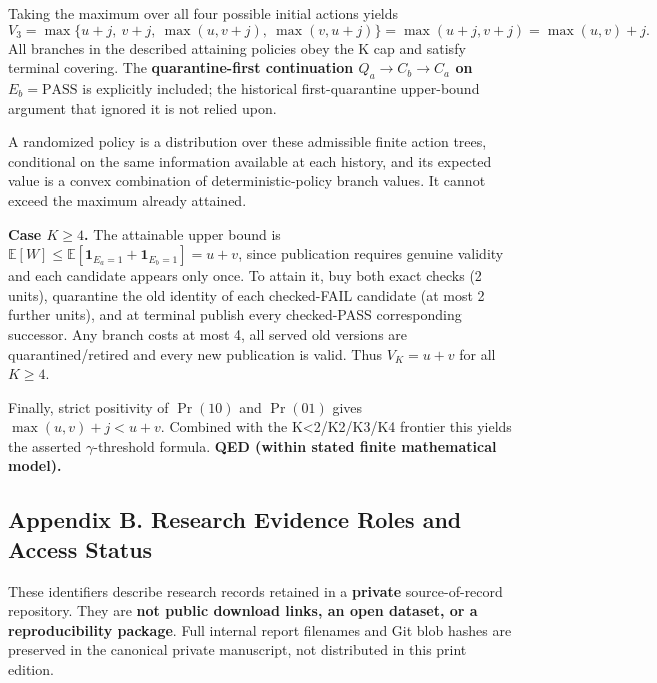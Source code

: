 \documentclass[
  10pt,
  american,
  a4paper,
]{article}
\begin{document}
Taking the maximum over all four possible initial actions yields \[
V_3=\max\{u+j,\ v+j,\ \max(u,v+j),\ \max(v,u+j)\}
=\max(u+j,v+j)=\max(u,v)+j.
\] All branches in the described attaining policies obey the K cap and
satisfy terminal covering. The \textbf{quarantine-first continuation
\(Q_a\to C_b\to C_a\) on \(E_b=\mathrm{PASS}\)} is explicitly included;
the historical first-quarantine upper-bound argument that ignored it is
not relied upon.

A randomized policy is a distribution over these admissible finite
action trees, conditional on the same information available at each
history, and its expected value is a convex combination of
deterministic-policy branch values. It cannot exceed the maximum already
attained.

\textbf{Case \(K\ge4\).} The attainable upper bound is
\(\mathbb E[W]\le\mathbb E[\mathbf 1_{E_a=1}+\mathbf 1_{E_b=1}]=u+v\),
since publication requires genuine validity and each candidate appears
only once. To attain it, buy both exact checks (2 units), quarantine the
old identity of each checked-FAIL candidate (at most 2 further units),
and at terminal publish every checked-PASS corresponding successor. Any
branch costs at most 4, all served old versions are quarantined/retired
and every new publication is valid. Thus \(V_K=u+v\) for all \(K\ge4\).

Finally, strict positivity of \(\Pr(10)\) and \(\Pr(01)\) gives
\(\max(u,v)+j<u+v\). Combined with the K\textless2/K2/K3/K4 frontier
this yields the asserted \(\gamma\)-threshold formula. \textbf{QED
(within stated finite mathematical model).}

\hypertarget{appendix-b.-research-evidence-roles-and-access-status}{%
\subsection{Appendix B. Research Evidence Roles and Access
Status}\label{appendix-b.-research-evidence-roles-and-access-status}}

These identifiers describe research records retained in a
\textbf{private} source-of-record repository. They are \textbf{not
public download links, an open dataset, or a reproducibility package}.
Full internal report filenames and Git blob hashes are preserved in the
canonical private manuscript, not distributed in this print edition.
\end{document}
